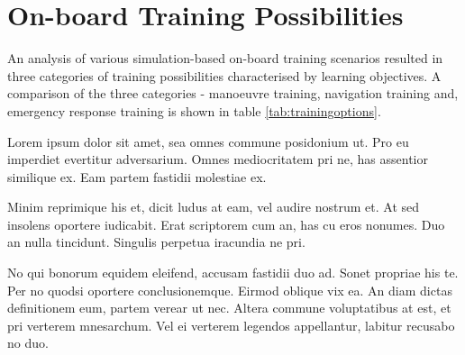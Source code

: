 \section{On-board Training Possibilities}
\label{sec:trainingcomparison}
An analysis of various simulation-based on-board training scenarios resulted in three categories of training possibilities characterised by learning objectives. A comparison of the three categories - manoeuvre training, navigation training and, emergency response training is shown in table \ref{tab:trainingoptions}.

Lorem ipsum dolor sit amet, sea omnes commune posidonium ut. Pro eu imperdiet evertitur adversarium. Omnes mediocritatem pri ne, has assentior similique ex. Eam partem fastidii molestiae ex.

Minim reprimique his et, dicit ludus at eam, vel audire nostrum et. At sed insolens oportere iudicabit. Erat scriptorem cum an, has cu eros nonumes. Duo an nulla tincidunt. Singulis perpetua iracundia ne pri.

No qui bonorum equidem eleifend, accusam fastidii duo ad. Sonet propriae his te. Per no quodsi oportere conclusionemque. Eirmod oblique vix ea. An diam dictas definitionem eum, partem verear ut nec. Altera commune voluptatibus at est, et pri verterem mnesarchum. Vel ei verterem legendos appellantur, labitur recusabo no duo.

